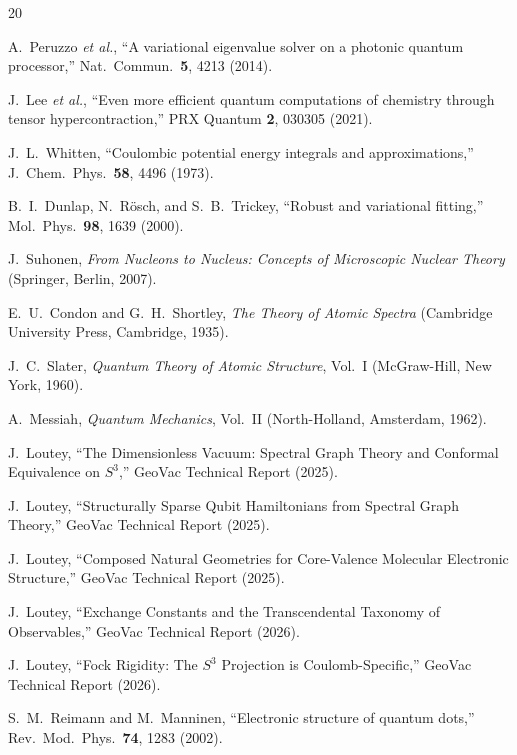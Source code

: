 \documentclass[twocolumn,pra,amsmath,amssymb,superscriptaddress]{revtex4-2}
\begin{document}
\begin{thebibliography}{20}

A.~Peruzzo \textit{et al.},
``A variational eigenvalue solver on a photonic quantum processor,''
Nat.\ Commun.\ \textbf{5}, 4213 (2014).

J.~Lee \textit{et al.},
``Even more efficient quantum computations of chemistry through
tensor hypercontraction,''
PRX Quantum \textbf{2}, 030305 (2021).

J.~L.~Whitten,
``Coulombic potential energy integrals and approximations,''
J.\ Chem.\ Phys.\ \textbf{58}, 4496 (1973).

B.~I.~Dunlap, N.~R\"osch, and S.~B.~Trickey,
``Robust and variational fitting,''
Mol.\ Phys.\ \textbf{98}, 1639 (2000).

J.~Suhonen,
\textit{From Nucleons to Nucleus: Concepts of Microscopic Nuclear Theory}
(Springer, Berlin, 2007).

E.~U.~Condon and G.~H.~Shortley,
\textit{The Theory of Atomic Spectra}
(Cambridge University Press, Cambridge, 1935).

J.~C.~Slater,
\textit{Quantum Theory of Atomic Structure}, Vol.~I
(McGraw-Hill, New York, 1960).

A.~Messiah,
\textit{Quantum Mechanics}, Vol.~II
(North-Holland, Amsterdam, 1962).

J.~Loutey,
``The Dimensionless Vacuum: Spectral Graph Theory and Conformal
Equivalence on $S^3$,''
GeoVac Technical Report (2025).

J.~Loutey,
``Structurally Sparse Qubit Hamiltonians from Spectral Graph Theory,''
GeoVac Technical Report (2025).

J.~Loutey,
``Composed Natural Geometries for Core-Valence Molecular
Electronic Structure,''
GeoVac Technical Report (2025).

J.~Loutey,
``Exchange Constants and the Transcendental Taxonomy of
Observables,''
GeoVac Technical Report (2026).

J.~Loutey,
``Fock Rigidity: The $S^3$ Projection is Coulomb-Specific,''
GeoVac Technical Report (2026).

S.~M.~Reimann and M.~Manninen,
``Electronic structure of quantum dots,''
Rev.\ Mod.\ Phys.\ \textbf{74}, 1283 (2002).

\end{thebibliography}
\end{document}
